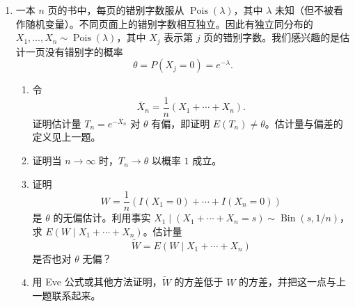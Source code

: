 \documentclass[UTF8, 12pt, fontset=fandol, oneside]{ctexart}
\begin{document}
\begin{enumerate}
  一种改进 $T_1$ 的策略如下。假设存在随机变量 $R$，使得 $T_2=E(T_1\mid R)$ 是 $X_1,\ldots,X_n$ 的函数（一般地，$E(T_1\mid R)$ 可能涉及未知量如 $\theta$，那样就不能作为估计量）。还假设 $P(T_1=T_2)<1$，且 $E(T_1^2)$ 有限。
  \begin{enumerate}
    \item 用 Jensen 不等式证明，$T_2$ 比 $T_1$ 更好，意义是均方误差更小：
    \[
      E(T_2-\theta)^2<E(T_1-\theta)^2.
    \]
    提示：对右端使用 Adam 公式。
    \item 估计量 $T$ 对 $\theta$ 的\textbf{偏差}定义为 $b(T)=E(T)-\theta$。统计中的一个重要恒等式，即\textbf{偏差--方差权衡}的一种形式，说均方误差等于方差加偏差平方：
    \[
      E(T-\theta)^2=\operatorname{Var}(T)+(b(T))^2.
    \]
    使用这个恒等式和 Eve 公式，给出 (a) 结论的另一种证明。
    \item 现在假设 $X_1,X_2,\ldots$ 独立同分布，均值为 $\theta$，并考虑特殊情形
    \[
      T_1=X_1,\qquad R=\sum_{j=1}^n X_j.
    \]
    求 $T_2$ 的简化形式，并检查当 $n\ge 2$ 时它的均方误差低于 $T_1$。还要说明当 $n\to\infty$ 时，$T_1$ 与 $T_2$ 分别会怎样。
  \end{enumerate}

  \item 一本 $n$ 页的书中，每页的错别字数服从 $\operatorname{Pois}(\lambda)$，其中 $\lambda$ 未知（但不被看作随机变量）。不同页面上的错别字数相互独立。因此有独立同分布的 $X_1,\ldots,X_n\sim\operatorname{Pois}(\lambda)$，其中 $X_j$ 表示第 $j$ 页的错别字数。我们感兴趣的是估计一页没有错别字的概率
  \[
    \theta=P(X_j=0)=e^{-\lambda}.
  \]
  \begin{enumerate}
    \item 令
    \[
      \bar X_n=\frac1n(X_1+\cdots+X_n).
    \]
    证明估计量 $T_n=e^{-\bar X_n}$ 对 $\theta$ 有偏，即证明 $E(T_n)\ne\theta$。估计量与偏差的定义见上一题。
    \item 证明当 $n\to\infty$ 时，$T_n\to\theta$ 以概率 $1$ 成立。
    \item 证明
    \[
      W=\frac1n(I(X_1=0)+\cdots+I(X_n=0))
    \]
    是 $\theta$ 的无偏估计。利用事实 $X_1\mid(X_1+\cdots+X_n=s)\sim\operatorname{Bin}(s,1/n)$，求 $E(W\mid X_1+\cdots+X_n)$。估计量
    \[
      \widetilde W=E(W\mid X_1+\cdots+X_n)
    \]
    是否也对 $\theta$ 无偏？
    \item 用 Eve 公式或其他方法证明，$\widetilde W$ 的方差低于 $W$ 的方差，并把这一点与上一题联系起来。
  \end{enumerate}


\end{enumerate}
\end{document}
